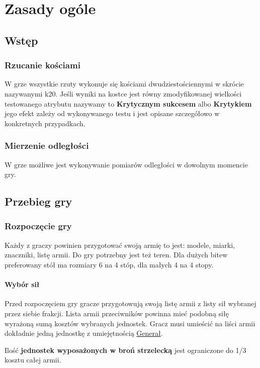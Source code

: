 \chapter{Zasady ogóle}

\section{Wstęp}

\subsection{Rzucanie kościami}
W grze wszystkie rzuty wykonuje się kościami dwudziestościennymi w skrócie nazywanymi k20. Jeśli wyniki na kostce jest równy zmodyfikowanej wielkości testowanego atrybutu nazywamy to \textbf{Krytycznym sukcesem} albo \textbf{Krytykiem} jego efekt zależy od wykonywanego testu i jest opisane szczegółowo w konkretnych przypadkach. 

\subsection{Mierzenie odległości}
W grze możliwe jest wykonywanie pomiarów odległości w dowolnym momencie gry. 


\section{Przebieg gry}

\subsection{Rozpoczęcie gry}
Każdy z graczy powinien przygotować swoją armię to jest: modele, miarki, znaczniki, listę armii. Do gry potrzebny jest też teren. Dla dużych bitew preferowany stół ma rozmiary 6 na 4 stóp, dla małych 4 na 4 stopy. 

\subsubsection{Wybór sił}
Przed rozpoczęciem gry gracze przygotowują swoją listę armii z listy sił wybranej przez siebie frakcji. Lista armii przeciwników powinna mieć podobną siłę wyrażoną sumą kosztów wybranych jednostek. Gracz musi umieścić na liści armii dokładnie jedną jednostkę z umiejętnością \hyperref[sec:link_uw_general]{Generał}.

Ilość \textbf{jednostek wyposażonych w broń strzelecką} jest ograniczone do 1/3 kosztu całej armii. 

